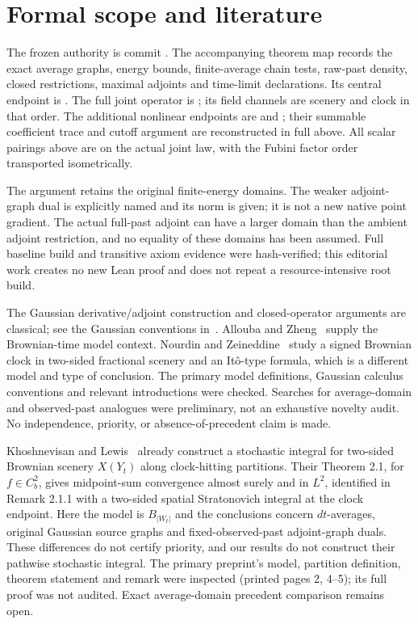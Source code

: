 \documentclass[11pt]{article}
\begin{document}
\section{Formal scope and literature}
\begingroup\raggedright
The frozen authority is commit
.
The accompanying theorem map records the exact average graphs, energy
bounds, finite-average chain tests, raw-past density, closed restrictions,
maximal adjoints and time-limit declarations. Its central endpoint is
. The full joint operator is
; its field channels are scenery and
clock in that order. The additional nonlinear endpoints are  and ; their summable coefficient trace and cutoff argument are reconstructed in full above. All scalar pairings above are on the actual joint
law, with the Fubini factor order transported isometrically.

The argument retains the original finite-energy domains. The weaker
adjoint-graph dual is explicitly named and its norm is given; it is not
a new native point gradient. The actual full-past adjoint can have a
larger domain than the ambient adjoint restriction, and no equality of
these domains has been assumed. Full baseline build and transitive axiom
evidence were hash-verified; this editorial work creates no new Lean
proof and does not repeat a resource-intensive root build.

The Gaussian derivative/adjoint construction and closed-operator arguments
are classical; see the Gaussian conventions in~\cite{SV}. Allouba and
Zheng~\cite{AZ} supply the Brownian-time model context. Nourdin and
Zeineddine~\cite{NZ} study a signed Brownian clock in two-sided fractional
scenery and an It\^o-type formula, which is a different model and type of
conclusion. The primary model definitions, Gaussian calculus conventions
and relevant introductions were checked. Searches for average-domain
and observed-past analogues were preliminary, not an exhaustive novelty
audit. No independence, priority, or absence-of-precedent claim is made.

Khoshnevisan and Lewis~\cite{KL} already construct a stochastic
integral for two-sided Brownian scenery $X(Y_t)$ along clock-hitting
partitions. Their Theorem 2.1, for $f\in C_b^2$, gives midpoint-sum
convergence almost surely and in $L^2$, identified in Remark 2.1.1
with a two-sided spatial Stratonovich integral at the clock endpoint.
Here the model is $B_{|W_t|}$ and the conclusions concern
$dt$-averages, original Gaussian source graphs and fixed-observed-past
adjoint-graph duals. These differences do not certify priority,
and our results do not construct their pathwise stochastic integral.
The primary preprint's model, partition definition, theorem statement
and remark were inspected (printed pages 2, 4--5); its full proof
was not audited. Exact average-domain precedent comparison remains open.
\end{document}
